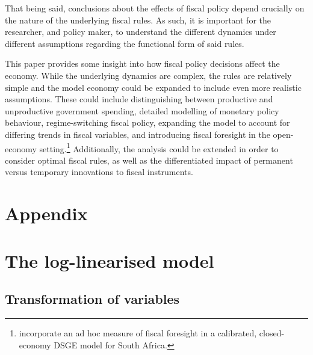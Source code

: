 \documentclass[a4paper,11pt]{article}
\numberwithin{equation}{section}
\begin{document}
	That being said, conclusions about the effects of fiscal policy depend crucially on the nature of the underlying fiscal rules. As such, it is important for the researcher, and policy maker, to understand the different dynamics under different assumptions regarding the functional form of said rules.  
	
	This paper provides some insight into how fiscal policy decisions affect the economy. While the underlying dynamics are complex, the rules are relatively simple and the model economy could be expanded to include even more realistic assumptions. These could include distinguishing between productive and unproductive government spending, detailed modelling of monetary	policy behaviour, regime-switching fiscal policy, expanding the model to account for differing trends in fiscal variables, and introducing fiscal foresight in the open-economy setting.\footnote{\cite{jooste2017} incorporate an ad hoc measure of fiscal foresight in a calibrated, closed-economy DSGE model for South Africa.} Additionally, the analysis could be extended in order to consider optimal fiscal rules, as well as the differentiated impact of permanent versus temporary innovations to fiscal instruments. 
	
\newpage
\thispagestyle{plain}
\nocite{}



\newpage
\appendix 

\setcounter{table}{0} \renewcommand{\thetable}{A.\arabic{table}}
\setcounter{section}{0}
\setcounter{subsection}{0}
\renewcommand{\thesection}{A.\arabic{section}}  

\setcounter{equation}{0}
\renewcommand\theequation{A.\arabic{equation}}	 

\section*{Appendix} \label{app}

\section{The log-linearised model} 
	
	\subsection{Transformation of variables}
		
\end{document}
